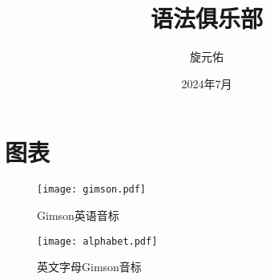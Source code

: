 \documentclass{yufa}
\title{语法俱乐部}
\author{旋元佑}
\date{2024年7月}
\begin{document}

\frontmatter
\maketitle

\tableofcontents

% 
\mainmatter

% 
% 

\appendix

\chapter{图表}
\cleardoublepage

\begin{figure}[htbp!]
  \centering
  \texttt{[image: gimson.pdf]}
  \caption{\label{fig:gimson}Gimson英语音标}

  \bigskip

  \texttt{[image: alphabet.pdf]}
  \caption{\label{fig:alphabet}英文字母Gimson音标}

\end{figure}

\backmatter
\end{document}
